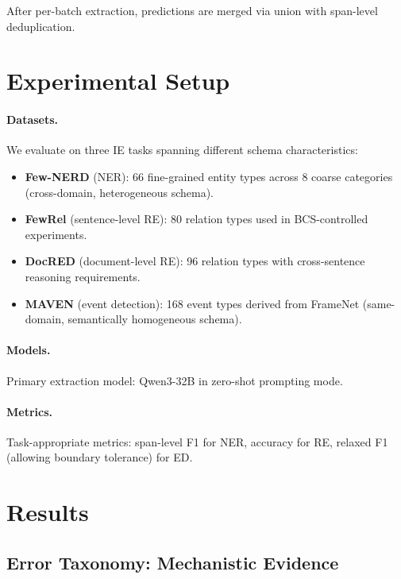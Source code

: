 \documentclass[11pt,a4paper]{article}
\begin{document}
After per-batch extraction, predictions are merged via union with span-level deduplication.

\section{Experimental Setup}

\paragraph{Datasets.}
We evaluate on three IE tasks spanning different schema characteristics:
\begin{itemize}
\item \textbf{Few-NERD} (NER): 66 fine-grained entity types across 8 coarse categories (cross-domain, heterogeneous schema).
\item \textbf{FewRel} (sentence-level RE): 80 relation types used in BCS-controlled experiments.
\item \textbf{DocRED} (document-level RE): 96 relation types with cross-sentence reasoning requirements.
\item \textbf{MAVEN} (event detection): 168 event types derived from FrameNet (same-domain, semantically homogeneous schema).
\end{itemize}

\paragraph{Models.} Primary extraction model: Qwen3-32B in zero-shot prompting mode.

\paragraph{Metrics.} Task-appropriate metrics: span-level F1 for NER, accuracy for RE, relaxed F1 (allowing boundary tolerance) for ED.

\section{Results}

\subsection{Error Taxonomy: Mechanistic Evidence}
\label{sec:error-taxonomy}
\end{document}
